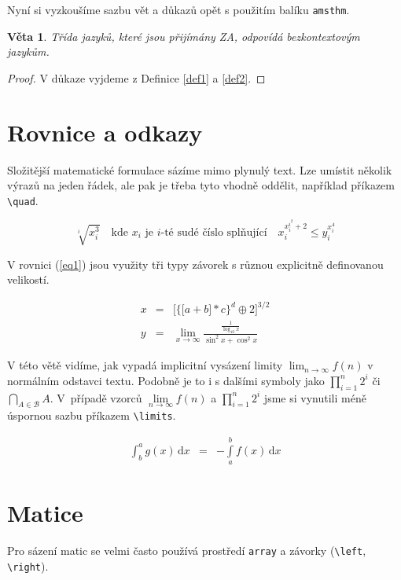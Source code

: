 \documentclass[11pt,twocolumn,a4paper]{article}
\theoremstyle{definition}
\newtheorem{theorem}{Věta}
\begin{document}
Nyní si vyzkoušíme sazbu vět a důkazů opět s použitím balíku \texttt{amsthm}.

\begin{theorem}
    \emph{Třída jazyků, které jsou přijímány ZA, odpovídá \textnormal{bezkontextovým jazykům}.}
\end{theorem}

\begin{proof}
    V důkaze vyjdeme z Definice \ref{def1} a \ref{def2}.
\end{proof}


\section{Rovnice a odkazy}
Složitější matematické formulace sázíme mimo plynulý text. 
Lze umístit několik výrazů na jeden řádek, ale pak je třeba tyto vhodně oddělit, například příkazem \verb|\quad|.

\begin{equation}
    \sqrt[i]{x_i^3}\quad\text{kde } x_i \text{ je } i\text{-té sudé číslo splňující}\quad x_i^{x_{i}^{i^2}+2}\leq y_i^{x_i^4} \nonumber
\end{equation}

V rovnici (\ref{eq1}) jsou využity tři typy závorek s různou explicitně definovanou velikostí.

\begin{eqnarray}
    \label{eq1}
    x&=&\bigg[{\Big\{}{\big[}a+b{\big]} * c{\Big\}}^{d} \oplus 2\bigg]^{3 / 2}\\
    y&=&\lim _{x \rightarrow \infty} \frac{\frac{1}{\log _{10} x}}{\sin ^2 x+\cos ^2 x} \nonumber 
\end{eqnarray}

V této větě vidíme, jak vypadá implicitní vysázení limity $\lim _{n \rightarrow \infty}f(n)$ v normálním odstavci textu. Podobně je to i s dalšími symboly jako $\prod_{i=1}^n 2^i$ či $\bigcap_{A\in \mathcal{B}} A$. V~případě vzorců $\lim\limits_{n \rightarrow \infty}f(n)$ a $\prod\limits_{i=1}^n 2^i$ jsme si vynutili méně úspornou sazbu příkazem \verb|\limits|.

\begin{eqnarray}
    \label{eq2}
    \int_b^a g(x)\,\mathrm{d}x & = & -\int\limits_a^b f(x)\,\mathrm{d}x
\end{eqnarray}

\section{Matice}
Pro sázení matic se velmi často používá prostředí \texttt{array} a závorky (\verb|\left|, \verb|\right|).
\end{document}
